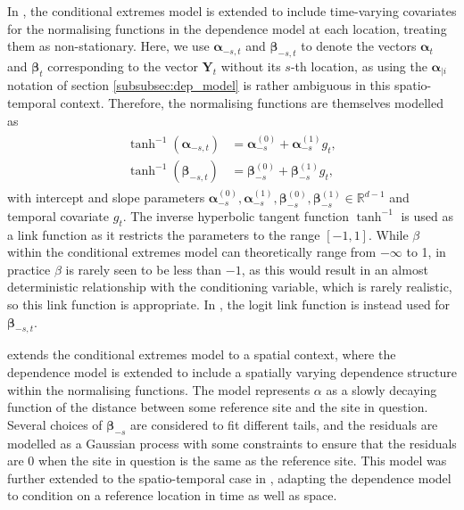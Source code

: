 \documentclass{article}
\numberwithin{equation}{section}
\begin{document}
In \citet{Winter2016}, the conditional extremes model is extended to include time-varying covariates for the normalising functions in the dependence model at each location, treating them as non-stationary.
Here, we use $\bm{\alpha}_{-s, t}$ and $\bm{\beta}_{-s, t}$ to denote the vectors $\bm{\alpha}_t$ and $\bm{\beta}_t$ corresponding to the vector $\bm{Y}_t$ without its $s$-th location, as using the $\bm{\alpha}_{\mid i}$ notation of section \ref{subsubsec:dep_model}
is rather ambiguous in this spatio-temporal context. %
Therefore, the normalising functions are themselves modelled as
\begin{align} \label{eq:ce_winter}
  \begin{split}
  \tanh^{-1}(\bm{\alpha}_{-s, t}) &= \bm{\alpha}^{(0)}_{-s} + \bm{\alpha}^{(1)}_{-s}g_t, \\
  \tanh^{-1}(\bm{\beta}_{-s, t}) &= \bm{\beta}^{(0)}_{-s} + \bm{\beta}^{(1)}_{-s}g_t,
  \end{split}
\end{align}
with intercept and slope parameters $\bm{\alpha}^{(0)}_{-s}, \bm{\alpha}^{(1)}_{-s}, \bm{\beta}^{(0)}_{-s}, \bm{\beta}^{(1)}_{-s} \in \mathbb{R}^{d-1}$ and temporal covariate $g_t$.
The inverse hyperbolic tangent function $\tanh^{-1}$ is used as a link function as it restricts the parameters to the range $[-1, 1]$. 
While $\beta$ within the conditional extremes model can theoretically range from $-\infty$ to 1, in practice $\beta$ is rarely seen to be less than $-1$, as this would result in an almost deterministic relationship with the conditioning variable, which is rarely realistic, so this link function is appropriate. 
In \citet{Richards2023}, the logit link function is instead used for $\bm{\beta}_{-s, t}$. 

\citet{Wadsworth2018} extends the conditional extremes model to a spatial context, where the dependence model is extended to include a spatially varying dependence structure within the normalising functions. 
The model represents $\alpha$ as a slowly decaying function of the distance between some reference site and the site in question.
Several choices of $\bm{\beta}_{-s}$ are considered to fit different tails, and the residuals are modelled as a Gaussian process with some constraints to ensure that the residuals are 0 when the site in question is the same as the reference site.
This model was further extended to the spatio-temporal case in \citet{Simpson2021}, adapting the dependence model to condition on a reference location in time as well as space. 
\end{document}

